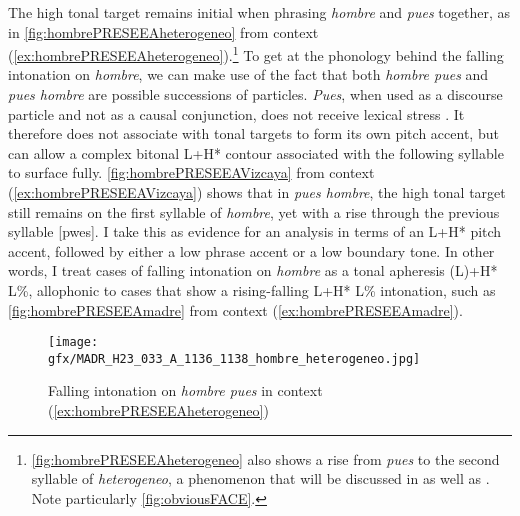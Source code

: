 \largerpage The high tonal target remains initial when phrasing \textit{hombre} and \textit{pues} together, as in \autoref{fig:hombrePRESEEAheterogeneo} from context (\ref{ex:hombrePRESEEAheterogeneo}).\footnote{\autoref{fig:hombrePRESEEAheterogeneo} also shows a rise from \textit{pues} to the second syllable of \textit{heterogeneo}, a phenomenon that will be discussed in  as well as . Note particularly \autoref{fig:obviousFACE}.} To get at the phonology behind the falling intonation on \textit{hombre}, we can make use of the fact that both \textit{hombre pues} and \textit{pues hombre} are possible successions of particles. \textit{Pues}, when used as a discourse particle and not as a causal conjunction, does not receive lexical stress \citep[47]{AlarcosLlorach.1994}. It therefore does not associate with tonal targets to form its own pitch accent, but can allow a complex bitonal L+H* contour associated with the following syllable to surface fully. \autoref{fig:hombrePRESEEAVizcaya} from context (\ref{ex:hombrePRESEEAVizcaya}) shows that in \textit{pues hombre}, the high tonal target still remains on the first syllable of \textit{hombre}, yet with a rise through the previous syllable [pwes]. I take this as evidence for an analysis in terms of an L+H* pitch accent, followed by either a low phrase accent or a low boundary tone. In other words, I treat cases of falling intonation on \textit{hombre} as a tonal aphe\-re\-sis (L)+H* L\%, allophonic to cases that show a rising-falling L+H* L\% intonation, such as \autoref{fig:hombrePRESEEAmadre} from context (\ref{ex:hombrePRESEEAmadre}).\largerpage

\begin{figure}
	\texttt{[image: gfx/MADR\_H23\_033\_A\_1136\_1138\_hombre\_heterogeneo.jpg]}
	\caption[Falling intonation on \textit{hombre pues} in context (\ref{ex:hombrePRESEEAheterogeneo})]{Falling intonation on \textit{hombre pues} in context (\ref{ex:hombrePRESEEAheterogeneo}) \href{https://osf.io/brn9z/}{\faVolumeUp} \label{fig:hombrePRESEEAheterogeneo}}
\end{figure}

